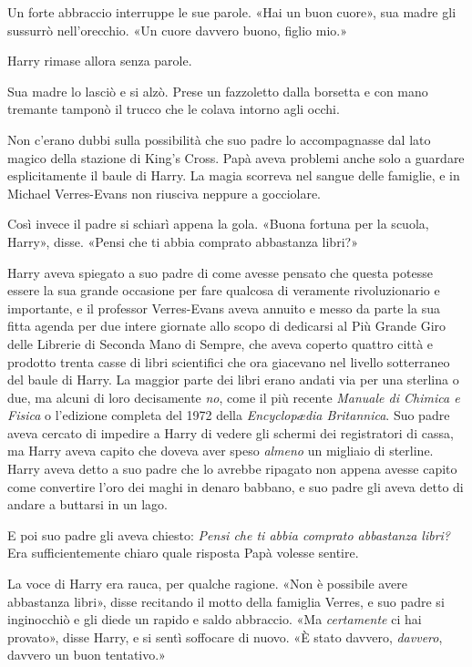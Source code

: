 Un forte abbraccio interruppe le sue parole. «Hai un buon cuore», sua madre gli sussurrò nell’orecchio. «Un cuore davvero buono, figlio mio.»

Harry rimase allora senza parole.

Sua madre lo lasciò e si alzò. Prese un fazzoletto dalla borsetta e con mano tremante tamponò il trucco che le colava intorno agli occhi.

Non c’erano dubbi sulla possibilità che suo padre lo accompagnasse dal lato magico della stazione di King’s Cross. Papà aveva problemi anche solo a guardare esplicitamente il baule di Harry. La magia scorreva nel sangue delle famiglie, e in Michael Verres-Evans non riusciva neppure a gocciolare.

Così invece il padre si schiarì appena la gola. «Buona fortuna per la scuola, Harry», disse. «Pensi che ti abbia comprato abbastanza libri?»

Harry aveva spiegato a suo padre di come avesse pensato che questa potesse essere la sua grande occasione per fare qualcosa di veramente rivoluzionario e importante, e il professor Verres-Evans aveva annuito e messo da parte la sua fitta agenda per due intere giornate allo scopo di dedicarsi al Più Grande Giro delle Librerie di Seconda Mano di Sempre, che aveva coperto quattro città e prodotto trenta casse di libri scientifici che ora giacevano nel livello sotterraneo del baule di Harry. La maggior parte dei libri erano andati via per una sterlina o due, ma alcuni di loro decisamente \textit{no}, come il più recente \textit{Manuale di Chimica e Fisica} o l’edizione completa del 1972 della \textit{Encyclopædia Britannica}. Suo padre aveva cercato di impedire a Harry di vedere gli schermi dei registratori di cassa, ma Harry aveva capito che doveva aver speso \textit{almeno} un migliaio di sterline. Harry aveva detto a suo padre che lo avrebbe ripagato non appena avesse capito come convertire l’oro dei maghi in denaro babbano, e suo padre gli aveva detto di andare a buttarsi in un lago.

E poi suo padre gli aveva chiesto: \textit{Pensi che ti abbia comprato abbastanza libri?} Era sufficientemente chiaro quale risposta Papà volesse sentire.

La voce di Harry era rauca, per qualche ragione. «Non è possibile avere abbastanza libri», disse recitando il motto della famiglia Verres, e suo padre si inginocchiò e gli diede un rapido e saldo abbraccio. «Ma \textit{certamente} ci hai provato», disse Harry, e si sentì soffocare di nuovo. «È stato davvero, \textit{davvero}, davvero un buon tentativo.»

